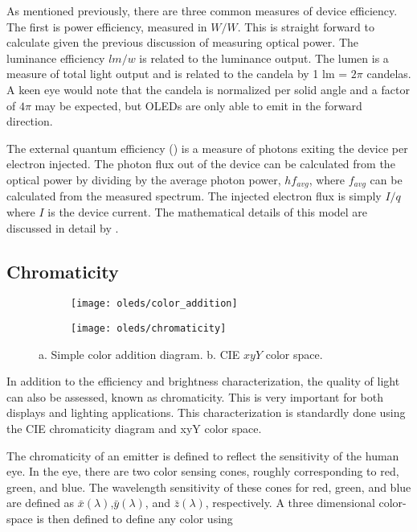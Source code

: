 \documentclass[../thesis.tex]{subfiles}
\begin{document}
As mentioned previously, there are three common measures of device efficiency.  
The first is power efficiency, measured in $W/W$.
This is straight forward to calculate given the previous discussion of measuring optical power.
The luminance efficiency $lm/w$ is related to the luminance output.
The lumen is a measure of total light output and is related to the candela by 1 lm = $2\pi$ candelas.
A keen eye would note that the candela is normalized per solid angle and a factor of $4\pi$ may be expected, but OLEDs are only able to emit in the forward direction.

The external quantum efficiency (\eqe) is a measure of photons exiting the device per electron injected.
The photon flux out of the device can be calculated from the optical power by dividing by the average photon power, $hf_{avg}$, where $f_{avg}$ can be calculated from the measured spectrum.
The injected electron flux is simply $I/q$ where $I$ is the device current.
The mathematical details of this model are discussed in detail by \textcite{Forrest2003}.%

\subsection{Chromaticity}
\begin{figure}[ht]
\centering
\begin{subfigure}{.4\textwidth}
\texttt{[image: oleds/color\_addition]}
\caption{}
\label{fig:oleds_color_addition}
\end{subfigure}
\begin{subfigure}{.4\textwidth}
\texttt{[image: oleds/chromaticity]}
\caption{}
\label{fig:oleds_cie}
\end{subfigure}
\caption{a. Simple color addition diagram. b. CIE $xyY$ color space.}
\end{figure}
In addition to the efficiency and brightness characterization, the quality of light can also be assessed, known as chromaticity.
This is very important for both displays and lighting applications.
This characterization is standardly done using the CIE chromaticity diagram and xyY color space.\supercite{Smith1931,Wright1929,Guild1932}

The chromaticity of an emitter is defined to reflect the sensitivity of the human eye.
In the eye, there are two color sensing cones, roughly corresponding to red, green, and blue.
The wavelength sensitivity of these cones for red, green, and blue are defined as $\bar{x}(\lambda)$,$\bar{y}(\lambda)$, and $\bar{z}(\lambda)$, respectively.
A three dimensional color-space is then defined to define any color using
\end{document}
